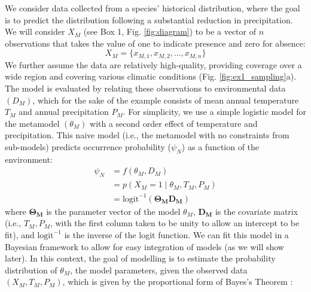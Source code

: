 We consider data collected from a species' historical distribution, where the goal is to predict the distribution following a substantial reduction in precipitation. 
We will consider \(X_M\) (see Box 1, Fig. \ref{fig:diagram}) to be a vector of $n$ observations that takes the value of one to indicate presence and zero for absence:
\begin{equation}
X_M = \{x_{M,1}, x_{M,2}, \ldots, x_{M,n}\}
\end{equation}
We further assume the data are relatively high-quality, providing coverage over a wide region and covering various climatic conditions (Fig. \ref{fig:ex1_sampling}a). 
The model is evaluated by relating these observations to environmental data \((D_M)\), which for the sake of the example consists of mean annual temperature $T_M$ and annual precipitation $P_M$. 
For simplicity, we use a simple logistic model for the metamodel \((\theta_M)\) with a second order effect of temperature and precipitation. 
This naive model (i.e., the metamodel with no constraints from sub-models) predicts  occurrence probability (\(\psi_N\)) as a function of the environment:
\begin{equation}
\begin{aligned}
	\psi_N &= f\left(\theta_M, D_M \right) \\
	&= p \left (X_M = 1 \mid \theta_M, T_M, P_M \right) \\
	&=\text{logit}^{-1}\left( \mathbf{\Theta_M} \mathbf{D_M} \right)
\end{aligned}
\end{equation}
where \(\mathbf{\Theta_M}\) is the parameter vector of the model \(\theta_M\), \(\mathbf{D_M} \) is the covariate matrix (i.e., \(T_M, P_M\), with the first column taken to be unity to allow an intercept to be fit), and \(\text{logit}^{-1}\) is the inverse of the logit function.
We can fit this model in a Bayesian framework to allow for easy integration of models (as we will show later).
In this context, the goal of modelling is to estimate the probability distribution of \(\theta_M\), the model parameters, given the observed data \((X_M, T_M, P_M)\), which is given by the proportional form of Bayes's Theorem \citep[for readers unfamiliar with general concepts in Bayesian inference, we recommend][for a concise introduction]{Link2010}:
